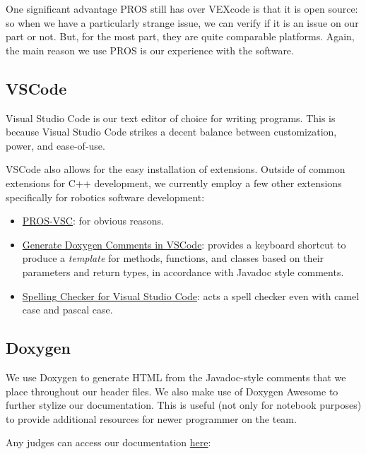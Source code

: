 One significant advantage PROS still has over VEXcode is that it is open source: so when we have a particularly strange issue, we can verify if it is an issue on our part or not. But, for the most part, they are quite comparable platforms. Again, the main reason we use PROS is our experience with the software.

\subsection{VSCode}
Visual Studio Code is our text editor of choice for writing programs. This is because Visual Studio Code strikes a decent balance between customization, power, and ease-of-use. 

VSCode also allows for the easy installation of extensions. Outside of common extensions for C++ development, we currently employ a few other extensions specifically for robotics software development: 
\begin{itemize}
    \item \href{https://github.com/purduesigbots/pros-vsc}{PROS-VSC}: for obvious reasons. 
    \item \href{https://github.com/cschlosser/doxdocgen}{Generate Doxygen Comments in VSCode}: provides a keyboard shortcut to produce a \textit{template} for methods, functions, and classes based on their parameters and return types, in accordance with Javadoc style comments. 
    \item \href{https://github.com/streetsidesoftware/vscode-spell-checker}{Spelling Checker for Visual Studio Code}: acts a spell checker even with camel case and pascal case. 
\end{itemize}

\subsection{Doxygen}
We use Doxygen \cite{bib:doxygen} to generate HTML from the Javadoc-style comments that we place throughout our header files. We also make use of Doxygen Awesome \cite{bib:doxygenawesome} to further stylize our documentation. This is useful (not only for notebook purposes) to provide additional resources for newer programmer on the team. 

Any judges can access our documentation \href{https://the-atu-robotics-club.github.io/ATUM-V5RC-High-Stakes-Code/index.html}{here}: \hspace{30px}

